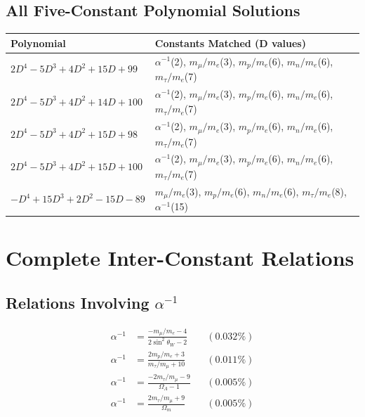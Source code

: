 \documentclass[11pt,a4paper]{article}
\begin{document}
\subsection{All Five-Constant Polynomial Solutions}

\begin{center}
\begin{tabular}{lp{8cm}}
\hline
Polynomial & Constants Matched (D values) \\
\hline
$2D^4 - 5D^3 + 4D^2 + 15D + 99$ & $\alpha^{-1}$(2), $m_\mu/m_e$(3), $m_p/m_e$(6), $m_n/m_e$(6), $m_\tau/m_e$(7) \\
$2D^4 - 5D^3 + 4D^2 + 14D + 100$ & $\alpha^{-1}$(2), $m_\mu/m_e$(3), $m_p/m_e$(6), $m_n/m_e$(6), $m_\tau/m_e$(7) \\
$2D^4 - 5D^3 + 4D^2 + 15D + 98$ & $\alpha^{-1}$(2), $m_\mu/m_e$(3), $m_p/m_e$(6), $m_n/m_e$(6), $m_\tau/m_e$(7) \\
$2D^4 - 5D^3 + 4D^2 + 15D + 100$ & $\alpha^{-1}$(2), $m_\mu/m_e$(3), $m_p/m_e$(6), $m_n/m_e$(6), $m_\tau/m_e$(7) \\
$-D^4 + 15D^3 + 2D^2 - 15D - 89$ & $m_\mu/m_e$(3), $m_p/m_e$(6), $m_n/m_e$(6), $m_\tau/m_e$(8), $\alpha^{-1}$(15) \\
\hline
\end{tabular}
\end{center}

\section{Complete Inter-Constant Relations}

\subsection{Relations Involving $\alpha^{-1}$}

\begin{align}
\alpha^{-1} &= \frac{-m_\mu/m_e - 4}{2\sin^2\theta_W - 2} &&(0.032\%) \\
\alpha^{-1} &= \frac{2m_p/m_e + 3}{m_\tau/m_\mu + 10} &&(0.011\%) \\
\alpha^{-1} &= \frac{-2m_\tau/m_\mu - 9}{\Omega_\Lambda - 1} &&(0.005\%) \\
\alpha^{-1} &= \frac{2m_\tau/m_\mu + 9}{\Omega_m} &&(0.005\%)
\end{align}
\end{document}
